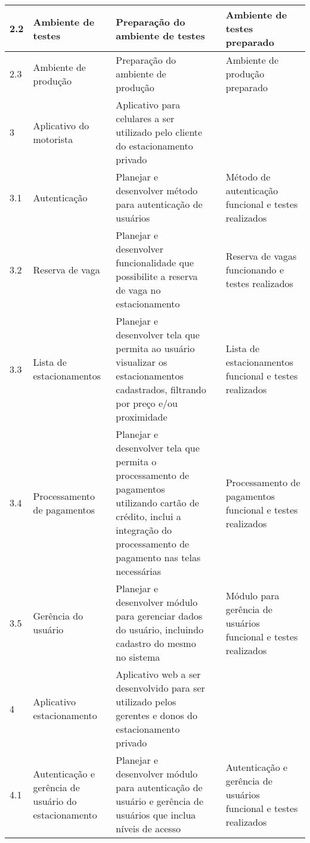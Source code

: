 \begin{longtable}{ l  p{}  p{}  l  p{}  }
		\midrule
		2.2         & Ambiente de testes                                        & Preparação do ambiente de testes &                   & Ambiente de testes preparado \\*
		\midrule
		2.3         & Ambiente de produção                                    & Preparação do ambiente de produção &                   & Ambiente de produção preparado \\*
		\midrule
		3           & Aplicativo do motorista                                   & Aplicativo para celulares a ser utilizado pelo cliente do estacionamento privado & & \\*
		\midrule
		3.1         & Autenticação                    & Planejar e desenvolver método para autenticação de usuários &                   & Método de autenticação funcional e testes realizados \\*
		\midrule
		3.2         & Reserva de vaga                                           & Planejar e desenvolver funcionalidade que possibilite a reserva de vaga no estacionamento &                   & Reserva de vagas funcionando e testes realizados \\*
		\midrule
		3.3         & Lista de estacionamentos                                  & Planejar e desenvolver tela que permita ao usuário visualizar os estacionamentos cadastrados, filtrando por preço e/ou proximidade &  & Lista de estacionamentos funcional e testes realizados \\*
		\midrule
		3.4         & Processamento de pagamentos                               & Planejar e desenvolver tela que permita o processamento de pagamentos utilizando cartão de crédito, inclui a integração do processamento de pagamento nas telas necessárias &                   & Processamento de pagamentos funcional e testes realizados \\*
		\midrule
		3.5         & Gerência do usuário                                     & Planejar e desenvolver módulo para gerenciar dados do usuário, incluindo cadastro do mesmo no sistema &                   & Módulo para gerência de usuários funcional e testes realizados \\*
		\midrule
		4           & Aplicativo estacionamento                                 & Aplicativo web a ser desenvolvido para ser utilizado pelos gerentes e donos do estacionamento privado & & \\*
		\midrule
		4.1         & Autenticação e gerência de usuário do estacionamento  & Planejar e desenvolver módulo para autenticação de usuário e gerência de usuários que inclua níveis de acesso & & Autenticação e gerência de usuários funcional e testes realizados \\*

\end{longtable}
